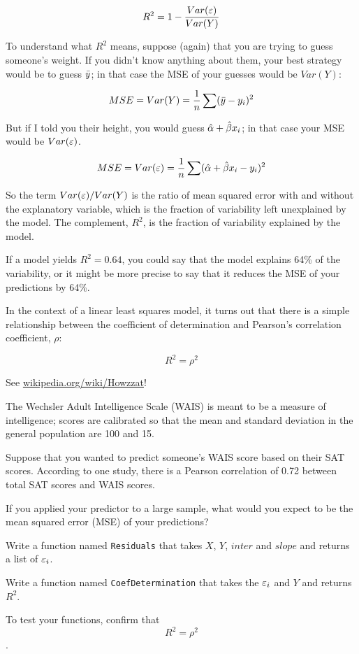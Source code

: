 \documentclass[12pt]{book}
\begin{document}
\[ R^2 = 1 - \frac{Var(\varepsilon)}{Var(Y)}\]

To understand what $R^2$ means, suppose (again) that you are trying
to guess someone's weight.  If you didn't know anything about them,
your best strategy would be to guess $\bar{y}$; in
that case the MSE of your guesses would be $Var(Y)$:

\[ MSE = Var(Y) = \frac{1}{n} \sum (\bar{y} - y_i)^2\]

But if I told you their height, you would guess $\hat{\alpha} +
\hat{\beta} x_i$; in that case your MSE would be $Var(\varepsilon)$.

\[ MSE = Var(\varepsilon) = 
\frac{1}{n} \sum (\hat{\alpha} + \hat{\beta} x_i - y_i)^2 \]

So the term $Var(\varepsilon)/Var(Y)$ is the ratio of mean squared error with
and without the explanatory variable, which is the fraction of
variability left unexplained by the model.  The complement, $R^2$,
is the fraction of variability explained by the model.

If a model yields $R^2 = 0.64$, you could say that the model explains
64\% of the variability, or it might be more precise to say that it
reduces the MSE of your predictions by 64\%.

In the context of a linear least squares model, it turns out that
there is a simple relationship between the coefficient of
determination and Pearson's correlation coefficient, $\rho$:

\[ R^2 = \rho^2 \]

See \url{wikipedia.org/wiki/Howzzat}!

\begin{ex}

The Wechsler Adult Intelligence Scale (WAIS) is meant to be a measure
of intelligence; scores are calibrated so that the mean and standard
deviation in the general population are 100 and 15.

Suppose that you wanted to predict someone's WAIS score based on their
SAT scores.  According to one study, there is a Pearson correlation of
0.72 between total SAT scores and WAIS scores.

If you applied your predictor to a large sample, what would you expect to
be the mean squared error (MSE) of your predictions?

\end{ex}


\begin{ex}

Write a function named {\tt Residuals} that takes $X$, $Y$, $inter$
and $slope$ and returns a list of $\varepsilon_i$.

Write a function named {\tt CoefDetermination} that takes the
$\varepsilon_i$ and $Y$ and returns $R^2$.

To test your functions, confirm that \[ R^2 = \rho^2 \].

\end{ex}
\end{document}
